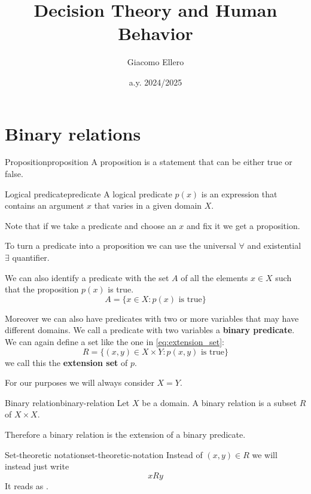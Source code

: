 \documentclass[12pt]{extarticle}
\title{Decision Theory and Human Behavior}
\author{Giacomo Ellero}
\date{a.y. 2024/2025}
\begin{document}
\firstpage

\section{Binary relations}

\begin{definition}{Proposition}{proposition}
    A proposition is a statement that can be either true or false.
\end{definition}

\begin{definition}{Logical predicate}{predicate}
    A logical predicate $p(x)$ is an expression that contains an argument $x$ that varies in a given domain $X$.
\end{definition}

Note that if we take a predicate and choose an $x$ and fix it we get a proposition.

To turn a predicate into a proposition we can use the universal $\forall$ and existential $\exists$ quantifier.

We can also identify a predicate with the set $A$ of all the elements $x \in X$ such that the proposition $p(x)$ is true.
\begin{equation}
    \label{eq:extension_set}
    A = \{ x \in X : p(x) \text{ is true} \}
\end{equation}

Moreover we can also have predicates with two or more variables that may have different domains.
We call a predicate with two variables a \textbf{binary predicate}. We can again define a set like the one in \cref{eq:extension_set}:
\begin{equation}
    R = \{ (x,y) \in X \times Y : p(x,y) \text{ is true} \}
\end{equation}
we call this the \textbf{extension set} of $p$.

For our purposes we will always consider $X = Y$.

\begin{definition}{Binary relation}{binary-relation}
    Let $X$ be a domain. A binary relation is a subset $R$ of $X \times X$.
\end{definition}

Therefore a binary relation is the extension of a binary predicate.

\begin{remark}{Set-theoretic notation}{set-theoretic-notation}
    Instead of $(x, y) \in R$ we will instead just write
    \begin{equation}
        xRy
    \end{equation}
    It reads as .
\end{remark}
\end{document}
